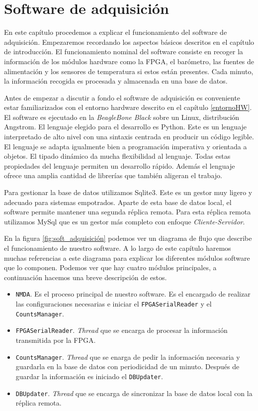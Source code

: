 \chapter{Software de adquisición}
\label{cap2}
En este capítulo procedemos a explicar el funcionamiento del software de adquisición. Empezaremos recordando los aspectos básicos descritos en el
capítulo de introducción. El funcionamiento nominal del software consiste en recoger la información de los módulos hardware como la FPGA, el
barómetro, las fuentes de alimentación y los sensores de temperatura si estos están presentes. Cada minuto, la información recogida es procesada y
almacenada en una base de datos. 
\par
Antes de empezar a discutir a fondo el software de adquisición es conveniente estar familiarizados con el entorno hardware descrito en el capítulo
\ref{entornoHW}. El software es ejecutado en la \emph{BeagleBone Black} sobre un Linux, distribución Angstrom. El lenguaje elegido para el desarrollo es
Python\cite{Python}. Este  es un lenguaje interpretado de alto nivel con una sintaxis centrada en producir un código legible. El lenguaje se adapta
igualmente bien a programación imperativa y orientada a objetos. El tipado dinámico da mucha flexibilidad al lenguaje. Todas estas propiedades del
lenguaje permiten un desarrollo rápido. Además el lenguaje ofrece una amplia cantidad de librerías que también aligeran el trabajo. 
\par
Para gestionar la base de datos utilizamos Sqlite3\cite{Sqlite}. Este es un gestor muy ligero y adecuado para sistemas empotrados. Aparte de esta base
de datos local, el software permite mantener una segunda réplica remota. Para esta réplica remota utilizamos MySql\cite{MySql} que es un gestor más
completo con enfoque \emph{Cliente-Servidor}.
\par
En la figura \ref{fig:soft_adquisición} podemos ver un diagrama de flujo que describe el funcionamiento de nuestro software. A lo largo de este
capítulo haremos muchas referencias a este diagrama para explicar los diferentes módulos software que lo componen. Podemos ver que hay cuatro módulos
principales, a continuación hacemos una breve descripción de estos. 
\begin{itemize}
  	\item	\texttt{NMDA}. Es el proceso principal de nuestro software. Es el encargado de realizar las configuraciones necesarias e iniciar
	  	el \texttt{FPGASerialReader} y el \texttt{CountsManager}.
	\item	\texttt{FPGASerialReader}. \emph{Thread} que se encarga de procesar la información transmitida por la FPGA.
	\item	\texttt{CountsManager}. \emph{Thread} que se enarga de pedir la información necesaria y guardarla en la base de datos con periodicidad
	  	de un minuto. Después de guardar la información es iniciado el \texttt{DBUpdater}.
	\item	\texttt{DBUpdater}. \emph{Thread} que se encarga de sincronizar la base de datos local con la réplica remota.
\end{itemize}

